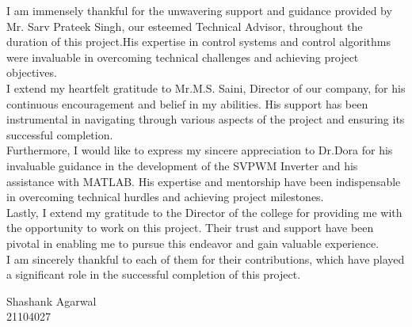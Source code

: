 I am immensely thankful for the unwavering support and guidance provided by Mr.
Sarv Prateek Singh, our esteemed Technical Advisor, throughout the duration of
this project.His expertise in control systems and control algorithms were
invaluable in overcoming technical challenges and achieving project
objectives.\\

I extend my heartfelt gratitude to Mr.M.S. Saini, Director of our company, for
his continuous encouragement and belief in my abilities. His support has been
instrumental in navigating through various aspects of the project and ensuring
its successful completion.\\

Furthermore, I would like to express my sincere appreciation to Dr.Dora for
his invaluable guidance in the development of the SVPWM Inverter and his
assistance with MATLAB. His expertise and mentorship have been indispensable in
overcoming technical hurdles and achieving project milestones.\\

Lastly, I extend my gratitude to the Director of the college for providing me
with the opportunity to work on this project. Their trust and support have been
pivotal in enabling me to pursue this endeavor and gain valuable experience.\\

I am sincerely thankful to each of them for their contributions, which have
played a significant role in the successful completion of this project.

\vfill
\begin{minipage}[t]{1\textwidth}
    \raggedleft
    Shashank Agarwal\\ 21104027
\end{minipage}